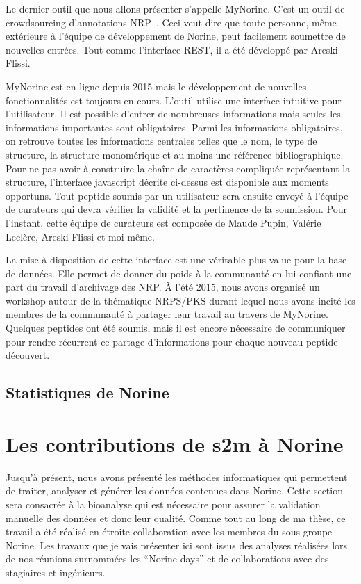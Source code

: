 Le dernier outil que nous allons présenter s'appelle MyNorine.
C'est un outil de crowdsourcing d'annotations NRP~\cite{flissi_norine_2016}.
Ceci veut dire que toute personne, même extérieure à l'équipe de développement de Norine, peut facilement soumettre de nouvelles entrées.
Tout comme l'interface REST, il a été développé par Areski Flissi.

MyNorine est en ligne depuis 2015 mais le développement de nouvelles fonctionnalités est toujours en cours.
L'outil utilise une interface intuitive pour l'utilisateur.
Il est possible d'entrer de nombreuses informations mais seules les informations importantes sont obligatoires.
Parmi les informations obligatoires, on retrouve toutes les informations centrales telles que le nom, le type de structure, la structure monomérique et au moins une référence bibliographique.
Pour ne pas avoir à construire la chaîne de caractères compliquée représentant la structure, l'interface javascript décrite ci-dessus est disponible aux moments opportuns.
Tout peptide soumis par un utilisateur sera ensuite envoyé à l'équipe de curateurs qui devra vérifier la validité et la pertinence de la soumission.
Pour l'instant, cette équipe de curateurs est composée de Maude Pupin, Valérie Leclère, Areski Flissi et moi même.

La mise à disposition de cette interface est une véritable plus-value pour la base de données.
Elle permet de donner du poids à la communauté en lui confiant une part du travail d'archivage des NRP.
À l'été 2015, nous avons organisé un workshop autour de la thématique NRPS/PKS durant lequel nous avons incité les membres de la communauté à partager leur travail au travers de MyNorine.
Quelques peptides ont été soumis, mais il est encore nécessaire de communiquer pour rendre récurrent ce partage d'informations pour chaque nouveau peptide découvert.


\subsection{Statistiques de Norine}








\section{Les contributions de s2m à Norine}
\label{cont_nor}

Jusqu'à présent, nous avons présenté les méthodes informatiques qui permettent de traiter, analyser et générer les données contenues dans Norine.
Cette section sera consacrée à la bioanalyse qui est nécessaire pour assurer la validation manuelle  des données et donc leur qualité.
Comme tout au long de ma thèse, ce travail a été réalisé en étroite collaboration avec les membres du sous-groupe Norine.
Les travaux que je vais présenter ici sont issus des analyses réalisées lors de nos réunions surnommées les ``Norine days'' et de collaborations avec des stagiaires et ingénieurs.

